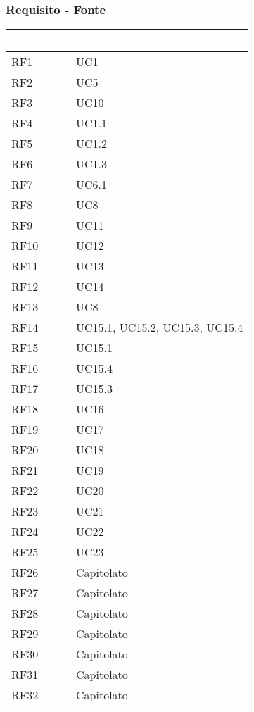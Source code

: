 \subsubsection{Requisito - Fonte}
{
      \setlength{\freewidth}{\dimexpr\textwidth-0\tabcolsep}
      \renewcommand{\arraystretch}{1.5}
      \centering
      \setlength{\aboverulesep}{0pt}
      \setlength{\belowrulesep}{0pt}
      \begin{longtable}{C{.47\freewidth} C{.47\freewidth}}
         \toprule
      \textcolor{white}{\textbf{Requisito}}&
      \textcolor{white}{\textbf{Fonti}}\\
      \toprule
      \endhead
      
      RF1 & UC1\\
      RF2 & UC5\\
      RF3 & UC10\\
      RF4 & UC1.1\\
      RF5 & UC1.2\\
      RF6 & UC1.3\\
      RF7 & UC6.1\\
      RF8 & UC8\\
      RF9 & UC11\\
      RF10 & UC12\\
      RF11 & UC13\\
      RF12 & UC14\\
      RF13 & UC8\\
      RF14 & UC15.1, UC15.2, UC15.3, UC15.4\\
      RF15 & UC15.1\\
      RF16 & UC15.4\\
      RF17 & UC15.3\\
      RF18 & UC16\\
      RF19 & UC17\\
      RF20 & UC18\\
      RF21 & UC19\\
      RF22 & UC20\\
      RF23 & UC21\\
      RF24 & UC22\\
      RF25 & UC23\\
      RF26 & Capitolato\\
      RF27 & Capitolato\\
      RF28 & Capitolato\\
      RF29 & Capitolato\\
      RF30 & Capitolato\\
      RF31 & Capitolato\\
      RF32 & Capitolato\\


\end{longtable}}
